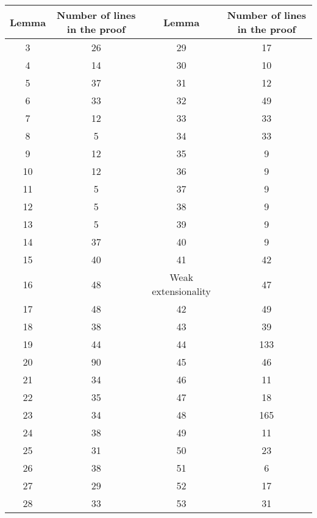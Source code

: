 \documentclass[submission,copyright,creativecommons]{eptcs}
\begin{document}
\begin{center}
\begin{tabular}{|c|c||c|c|}
\hline Lemma & Number of lines in the proof & Lemma & Number of lines in the proof \\
\hline 3 & 26 & 29 & 17 \\
\hline 4 & 14 & 30 & 10 \\
\hline 5 & 37 & 31 & 12 \\
\hline 6 & 33 & 32 & 49 \\
\hline 7 & 12 & 33 & 33 \\
\hline 8 & 5 & 34 & 33 \\
\hline 9 & 12 & 35 & 9 \\
\hline 10 & 12 & 36 & 9 \\
\hline 11 & 5 & 37 & 9 \\
\hline 12 & 5 & 38 & 9 \\
\hline 13 & 5 & 39 & 9 \\
\hline 14 & 37 & 40 & 9 \\
\hline 15 & 40 & 41 & 42 \\
\hline 16 & 48 & Weak extensionality & 47 \\
\hline 17 & 48 & 42 & 49 \\
\hline 18 & 38 & 43 & 39 \\
\hline 19 & 44 & 44 & 133 \\
\hline 20 & 90 & 45 & 46 \\
\hline 21 & 34 & 46 & 11 \\
\hline 22 & 35 & 47 & 18 \\
\hline 23 & 34 & 48 & 165 \\
\hline 24 & 38 & 49 & 11 \\
\hline 25 & 31 & 50 & 23 \\
\hline 26 & 38 & 51 & 6 \\
\hline 27 & 29 & 52 & 17 \\
\hline 28 & 33 & 53 & 31 \\
\hline
\end{tabular}
\end{center}






\end{document}
